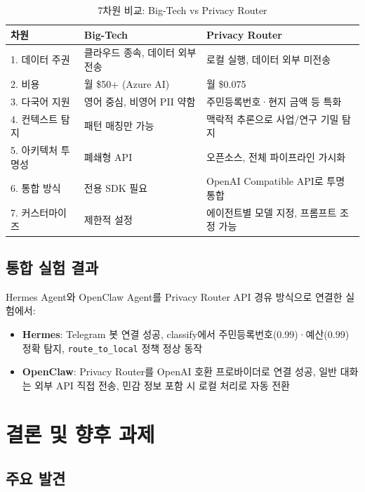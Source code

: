 \documentclass[11pt,a4paper]{article}
\begin{document}
\begin{table}[h]
\centering
\begin{tabular}{@{}p{2.5cm}p{4cm}p{4cm}@{}}
\toprule
차원 & Big-Tech & Privacy Router \\
\midrule
1. 데이터 주권 & 클라우드 종속, 데이터 외부 전송 & 로컬 실행, 데이터 외부 미전송 \\
2. 비용 & 월 \$50+ (Azure AI) & 월 \$0.075 \\
3. 다국어 지원 & 영어 중심, 비영어 PII 약함 & 주민등록번호·현지 금액 등 특화 \\
4. 컨텍스트 탐지 & 패턴 매칭만 가능 & 맥락적 추론으로 사업/연구 기밀 탐지 \\
5. 아키텍처 투명성 & 폐쇄형 API & 오픈소스, 전체 파이프라인 가시화 \\
6. 통합 방식 & 전용 SDK 필요 & OpenAI Compatible API로 투명 통합 \\
7. 커스터마이즈 & 제한적 설정 & 에이전트별 모델 지정, 프롬프트 조정 가능 \\
\bottomrule
\end{tabular}
\caption{7차원 비교: Big-Tech vs Privacy Router}
\end{table}

\subsection{통합 실험 결과}

Hermes Agent와 OpenClaw Agent를 Privacy Router API 경유 방식으로 연결한 실험에서:

\begin{itemize}[nosep]
  \item \textbf{Hermes}: Telegram 봇 연결 성공, classify에서 주민등록번호(0.99)·예산(0.99) 정확 탐지, \texttt{route\_to_local} 정책 정상 동작
  \item \textbf{OpenClaw}: Privacy Router를 OpenAI 호환 프로바이더로 연결 성공, 일반 대화는 외부 API 직접 전송, 민감 정보 포함 시 로컬 처리로 자동 전환
\end{itemize}

\section{결론 및 향후 과제}

\subsection{주요 발견}
\end{document}
